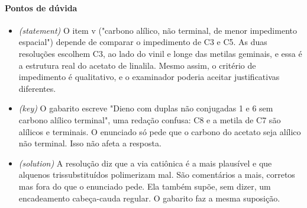 \documentclass{article}%
\begin{document}
\paragraph{Pontos de dúvida}%
\begin{itemize}%
\item%
\textit{(statement)} O item v ("carbono alílico, não terminal, de menor impedimento espacial") depende de comparar o impedimento de C3 e C5. As duas resoluções escolhem C3, ao lado do vinil e longe das metilas geminais, e essa é a estrutura real do acetato de linalila. Mesmo assim, o critério de impedimento é qualitativo, e o examinador poderia aceitar justificativas diferentes.%
\item%
\textit{(key)} O gabarito escreve "Dieno com duplas não conjugadas 1 e 6 sem carbono alílico terminal", uma redação confusa: C8 e a metila de C7 são alílicos e terminais. O enunciado só pede que o carbono do acetato seja alílico não terminal. Isso não afeta a resposta.%
\item%
\textit{(solution)} A resolução diz que a via catiônica é a mais plausível e que alquenos trissubstituídos polimerizam mal. São comentários a mais, corretos mas fora do que o enunciado pede. Ela também supõe, sem dizer, um encadeamento cabeça{-}cauda regular. O gabarito faz a mesma suposição.%
\end{itemize}%
\end{document}
